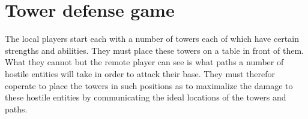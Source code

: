 \section{Tower defense game}
The local players start each with a number of towers each of which have certain strengths and abilities. They must place these towers on a table in front of them. What they cannot but the remote player can see is what paths a number of hostile entities will take in order to attack their base. They must therefor coperate to place the towers in such positions as to maximalize the damage to these hostile entities by communicating the ideal locations of the towers and paths. 